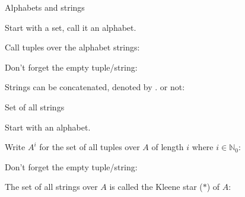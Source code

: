 \begin{frame}{Alphabets and strings}

  \vspace{2mm}

  Start with a set, call it an alphabet.


  \vspace{2mm}

  Call tuples over the alphabet strings:


  \vspace{2mm}

  Don't forget the empty tuple/string:

  \redmath{\epsilon = ()}

  \vspace{2mm}

  Strings can be concatenated, denoted by $.$ or not:



\end{frame}


\begin{frame}{Set of all strings}

  \vspace{2mm}

  Start with an alphabet.


  \vspace{2mm}

  Write $A^i$ for the set of all tuples over $A$ of length $i$ where $i \in \mathbb{N}_0$:


  \vspace{2mm}

  Don't forget the empty tuple/string:


  \vspace{2mm}

  The set of all strings over $A$ is called the \textcolor{gmitblue}{Kleene star ($*$)} of $A$:


\end{frame}


